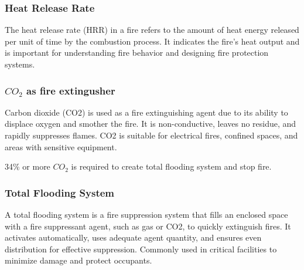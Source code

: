 \documentclass{article}
\begin{document}
\subsubsection*{Heat Release Rate}
The heat release rate (HRR) in a fire refers to the amount of heat energy released per unit of time by the combustion process. It indicates the fire's heat output and is important for understanding fire behavior and designing fire protection systems.

\subsubsection*{$CO_2$ as fire extingusher}
Carbon dioxide (CO2) is used as a fire extinguishing agent due to its ability to displace oxygen and smother the fire. It is non-conductive, leaves no residue, and rapidly suppresses flames. CO2 is suitable for electrical fires, confined spaces, and areas with sensitive equipment. 

34\% or more $CO_2$ is required to create total flooding system and stop fire. 

\subsubsection*{Total Flooding System}
A total flooding system is a fire suppression system that fills an enclosed space with a fire suppressant agent, such as gas or CO2, to quickly extinguish fires. It activates automatically, uses adequate agent quantity, and ensures even distribution for effective suppression. Commonly used in critical facilities to minimize damage and protect occupants.
\end{document}
